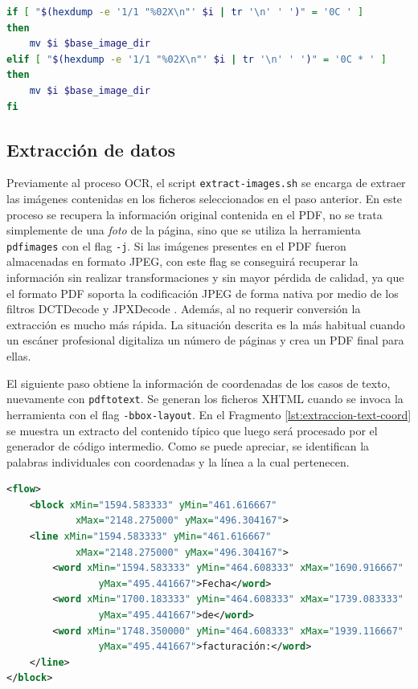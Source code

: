 \begin{lstlisting}[language=bash,caption={Detección del salto de página.},label=lst:deteccion-salto-pagina]
if [ "$(hexdump -e '1/1 "%02X\n"' $i | tr '\n' ' ')" = '0C ' ]
then
    mv $i $base_image_dir
elif [ "$(hexdump -e '1/1 "%02X\n"' $i | tr '\n' ' ')" = '0C * ' ]
then
    mv $i $base_image_dir
fi
\end{lstlisting}

\subsection{Extracción de datos}

Previamente al proceso OCR, el script \verb|extract-images.sh| se encarga de extraer las imágenes contenidas en los ficheros seleccionados en el paso anterior. En este proceso se recupera la información original contenida en el PDF, no se trata simplemente de una \emph{foto} de la página, sino que se utiliza la herramienta \verb|pdfimages| con el flag \verb|-j|. Si las imágenes presentes en el PDF fueron almacenadas en formato JPEG, con este flag se conseguirá recuperar la información sin realizar transformaciones y sin mayor pérdida de calidad, ya que el formato PDF soporta la codificación JPEG de forma nativa por medio de los filtros DCTDecode y JPXDecode \cite[23]{adobe_book_iso32000-1}. Además, al no requerir conversión la extracción es mucho más rápida. La situación descrita es la más habitual cuando un escáner profesional digitaliza un número de páginas y crea un PDF final para ellas.

El siguiente paso obtiene la información de coordenadas de los casos de texto, nuevamente con \verb|pdftotext|. Se generan los ficheros XHTML cuando se invoca la herramienta con el flag \verb|-bbox-layout|. En el Fragmento \ref{lst:extraccion-text-coord} se muestra un extracto del contenido típico que luego será procesado por el generador de código intermedio. Como se puede apreciar, se identifican la palabras individuales con coordenadas y la línea a la cual pertenecen.

\begin{lstlisting}[language=XML,caption={Extracción de texto con información de coordenadas.},label=lst:extraccion-text-coord]
<flow>
    <block xMin="1594.583333" yMin="461.616667" 
            xMax="2148.275000" yMax="496.304167">
    <line xMin="1594.583333" yMin="461.616667" 
            xMax="2148.275000" yMax="496.304167">
        <word xMin="1594.583333" yMin="464.608333" xMax="1690.916667" 
                yMax="495.441667">Fecha</word>
        <word xMin="1700.183333" yMin="464.608333" xMax="1739.083333"   
                yMax="495.441667">de</word>
        <word xMin="1748.350000" yMin="464.608333" xMax="1939.116667" 
                yMax="495.441667">facturación:</word>
    </line>
</block>
\end{lstlisting}

